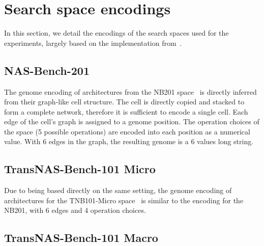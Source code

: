 \documentclass[10pt]{article} %
\begin{document}

\newpage




\newpage

\appendix

\section{Search space encodings}
\label{apx_encodings}

In this section, we detail the encodings of the search spaces used for the experiments, largely based on the implementation from~\citet{krishnakumar2022bench}.

\subsection{NAS-Bench-201}

The genome encoding of architectures from the NB201 space~\citep{dong2020bench} is directly inferred from their graph-like cell structure. The cell is directly copied and stacked to form a complete network, therefore it is sufficient to encode a single cell. Each edge of the cell's graph is assigned to a genome position. The operation choices of the space (5 possible operations) are encoded into each position as a numerical value. With 6 edges in the graph, the resulting genome is a 6 values long string.

\subsection{TransNAS-Bench-101 Micro}

Due to being based directly on the same setting, the genome encoding of architectures for the TNB101-Micro space~\citep{duan2021transnas} is similar to the encoding for the NB201, with 6 edges and 4 operation choices.

\subsection{TransNAS-Bench-101 Macro}
\end{document}
